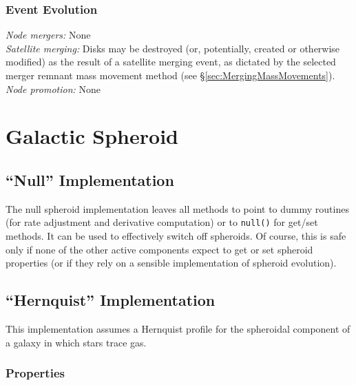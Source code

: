 \subsubsection{Event Evolution}

\noindent\emph{Node mergers:} None\\

\noindent\emph{Satellite merging:} Disks may be destroyed (or, potentially, created or otherwise modified) as the result of a satellite merging event, as dictated by the selected merger remnant mass movement method (see \S\ref{sec:MergingMassMovements}).\\

\noindent\emph{Node promotion:} None\\

\section{Galactic Spheroid}

\subsection{``Null'' Implementation}

The null spheroid implementation leaves all methods to point to dummy routines (for rate adjustment and derivative computation) or to {\tt null()} for get/set methods. It can be used to effectively switch off spheroids. Of course, this is safe only if none of the other active components expect to get or set spheroid properties (or if they rely on a sensible implementation of spheroid evolution).

\subsection{``Hernquist'' Implementation}

This implementation assumes a Hernquist profile \citep{hernquist_analytical_1990} for the spheroidal component of a galaxy in which stars trace gas.

\subsubsection{Properties}

